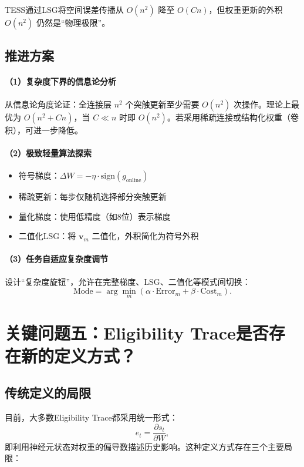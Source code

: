 \documentclass[journal,12pt,onecolumn]{IEEEtran}
\begin{document}
TESS通过LSG将空间误差传播从 \(O(n^2)\) 降至 \(O(Cn)\)，但权重更新的外积 \(O(n^2)\) 仍然是“物理极限”。

\subsection{推进方案}

\paragraph{（1）复杂度下界的信息论分析}
从信息论角度论证：全连接层 \(n^2\) 个突触更新至少需要 \(O(n^2)\) 次操作。理论上最优为 \(O(n^2 + Cn)\)，当 \(C \ll n\) 时即 \(O(n^2)\)。若采用稀疏连接或结构化权重（卷积），可进一步降低。

\paragraph{（2）极致轻量算法探索}
\begin{itemize}
    \item 符号梯度：\(\Delta W = -\eta \cdot \text{sign}(g_{\text{online}})\)
    \item 稀疏更新：每步仅随机选择部分突触更新
    \item 量化梯度：使用低精度（如8位）表示梯度
    \item 二值化LSG：将 \(\mathbf{v}_m\) 二值化，外积简化为符号外积
\end{itemize}

\paragraph{（3）任务自适应复杂度调节}
设计“复杂度旋钮”，允许在完整梯度、LSG、二值化等模式间切换：
\[
\text{Mode} = \arg\min_{m} \left( \alpha \cdot \text{Error}_m + \beta \cdot \text{Cost}_m \right).
\]

\section{关键问题五：Eligibility Trace是否存在新的定义方式？}

\subsection{传统定义的局限}

目前，大多数Eligibility Trace都采用统一形式：
\[
e_t = \frac{\partial s_t}{\partial W},
\]
即利用神经元状态对权重的偏导数描述历史影响。这种定义方式存在三个主要局限：
\end{document}
